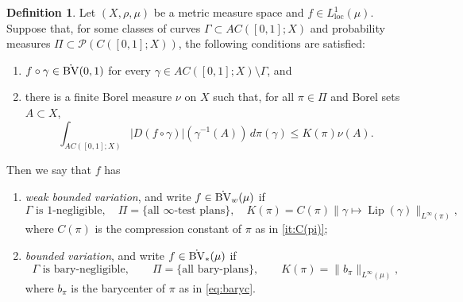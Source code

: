\documentclass[11pt]{amsart}
\theoremstyle{definition}
\newtheorem{definition}[theorem]{Definition}
\theoremstyle{remark}
\numberwithin{equation}{section}
\newcommand{\abs}[1]{|#1|}
\newcommand{\Norm}[2]{\|#1\|_{#2}}
\begin{document}
\begin{definition}\label{def:BVboth}
Let $(X,\rho,\mu)$ be a metric measure space and $f\in L^1_{\mathrm{loc}}(\mu)$.
Suppose that, for some classes of curves $\Gamma\subset AC([0,1];X)$ and probability
measures $\Pi\subset\mathscr P(C([0,1];X))$, the following conditions are satisfied:
\begin{enumerate}[\rm(i)]
  \item\label{it:BV(0,1)} $f\circ\gamma\in\dot{\rm BV}(0,1)$ for every $\gamma\in
  AC([0,1];X)\setminus\Gamma$, and
  \item\label{it:exists-nu} there is a finite Borel measure $\nu$ on $X$ such that, for all
  $\pi\in\Pi$ and Borel sets $A\subset X$,
\begin{equation}\label{eq:BVboth}
  \int_{AC([0,1];X)}\abs{D(f\circ\gamma)}(\gamma^{-1}(A))\,d\pi(\gamma)  \leq K(\pi)\nu(A).
\end{equation}
\end{enumerate}
Then we say that $f$ has
\begin{enumerate}[\rm(i)]
  \item\label{it:BVw} {\em weak bounded variation}, and write $f\in\dot{\rm BV}_w(\mu)$ if
\begin{equation*}
   \Gamma\text{ is $1$-negligible},\quad\Pi=\{\text{all $\infty$-test plans}\},\quad
   K(\pi)=C(\pi)\Norm{\gamma\mapsto\operatorname{Lip}(\gamma)}{L^\infty(\pi)},
\end{equation*}
where $C(\pi)$ is the compression constant of $\pi$ as in \eqref{it:C(pi)};
  \item\label{it:BV*} {\em bounded variation}, and write $f\in\dot{\rm BV}_*(\mu)$ if
\begin{equation*}
   \Gamma\text{ is bary-negligible},\qquad\Pi=\{\text{all bary-plans}\},\qquad
   K(\pi)=\Norm{b_\pi}{L^\infty(\mu)},
\end{equation*}
where $b_\pi$ is the barycenter of $\pi$ as in \eqref{eq:baryc}.
\end{enumerate}
\end{definition}
\end{document}
